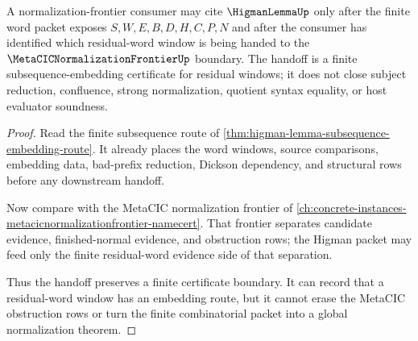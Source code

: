 \begin{theorem}
\label{thm:higman-lemma-normalization-frontier-handoff}
A normalization-frontier consumer may cite $\HigmanLemmaUp$ only after the finite word packet exposes $S,W,E,B,D,H,C,P,N$ and after the consumer has identified which residual-word window is being handed to the $\MetaCICNormalizationFrontierUp$ boundary. The handoff is a finite subsequence-embedding certificate for residual windows; it does not close subject reduction, confluence, strong normalization, quotient syntax equality, or host evaluator soundness.
\end{theorem}
\begin{proof}
Read the finite subsequence route of \autoref{thm:higman-lemma-subsequence-embedding-route}. It already places the word windows, source comparisons, embedding data, bad-prefix reduction, Dickson dependency, and structural rows before any downstream handoff.

Now compare with the MetaCIC normalization frontier of \autoref{ch:concrete-instances-metacicnormalizationfrontier-namecert}. That frontier separates candidate evidence, finished-normal evidence, and obstruction rows; the Higman packet may feed only the finite residual-word evidence side of that separation.

Thus the handoff preserves a finite certificate boundary. It can record that a residual-word window has an embedding route, but it cannot erase the MetaCIC obstruction rows or turn the finite combinatorial packet into a global normalization theorem.
\end{proof}

